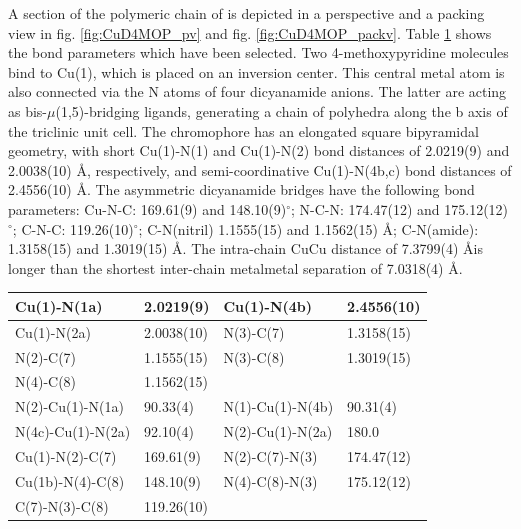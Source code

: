 A section of the polymeric chain of  is depicted in a perspective and a packing view in fig. \ref{fig:CuD4MOP_pv} and fig. \ref{fig:CuD4MOP_packv}. Table \ref{batab:CuD4MOP} shows the bond parameters which have been selected. Two 4-methoxypyridine molecules bind to Cu(1), which is placed on an inversion center. This central metal atom is also connected via the N atoms of four dicyanamide anions. The latter are acting as bis-$\mu$(1,5)-bridging ligands, generating a chain of polyhedra along the b axis of the triclinic unit cell. The  chromophore has an elongated square bipyramidal geometry, with short Cu(1)-N(1) and Cu(1)-N(2) bond distances of 2.0219(9) and 2.0038(10) \AA, respectively, and semi-coordinative Cu(1)-N(4b,c) bond distances of 2.4556(10) \AA. The asymmetric dicyanamide bridges have the following bond parameters: Cu-N-C: 169.61(9) and 148.10(9)$^\circ$; N-C-N: 174.47(12) and 175.12(12)$^\circ$; C-N-C: 119.26(10)$^\circ$; C-N(nitril) 1.1555(15) and 1.1562(15) \AA; C-N(amide): 1.3158(15) and 1.3019(15) \AA. The intra-chain Cu\ce{***}Cu distance of 7.3799(4) \AA  is longer than the shortest inter-chain metal\ce{***}metal separation of 7.0318(4) \AA. 

\renewcommand{\arraystretch}{1.5}
\begin{table}[htpb!]
\centering
{}
\begin{tabular}{|l|l|l|l|}
\hline
Cu(1)-N(1a) & 2.0219(9) & Cu(1)-N(4b) & 2.4556(10)\\
\hline
Cu(1)-N(2a) & 2.0038(10)& N(3)-C(7) & 1.3158(15)\\
\hline
N(2)-C(7) & 1.1555(15) & N(3)-C(8) & 1.3019(15)\\
\hline
N(4)-C(8) & 1.1562(15) &  & \\
\hline
\hline
N(2)-Cu(1)-N(1a) & 90.33(4) & N(1)-Cu(1)-N(4b) & 90.31(4)\\
\hline
N(4c)-Cu(1)-N(2a) & 92.10(4) & N(2)-Cu(1)-N(2a) & 180.0\\
\hline
Cu(1)-N(2)-C(7) & 169.61(9) & N(2)-C(7)-N(3) & 174.47(12)\\
\hline
Cu(1b)-N(4)-C(8)& 148.10(9) &N(4)-C(8)-N(3) & 175.12(12)\\
\hline
C(7)-N(3)-C(8)& 119.26(10) & &\\
\hline
\end{tabular}
\label{batab:CuD4MOP}
\end{table}


